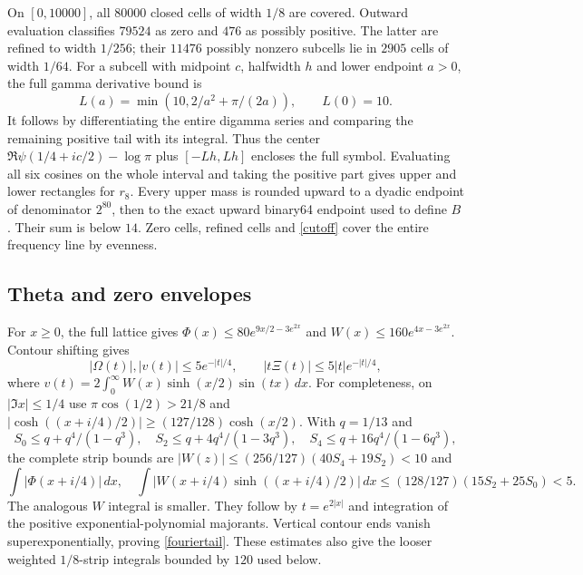 \documentclass[11pt]{article}
\newcommand{\dd}{\,d}
\numberwithin{equation}{section}
\begin{document}
On $[0,10000]$, all $80000$ closed cells of width $1/8$ are covered.
Outward evaluation classifies $79524$ as zero and $476$ as possibly
positive. The latter are refined to width $1/256$; their $11476$
possibly nonzero subcells lie in $2905$ cells of width $1/64$.
For a subcell with midpoint $c$, halfwidth $h$ and lower endpoint
$a>0$, the full gamma derivative bound is
\[
 L(a)=\min(10,2/a^2+\pi/(2a)),\qquad L(0)=10.
\]
It follows by differentiating the entire digamma series and comparing
the remaining positive tail with its integral. Thus the center
$\Re\psi(1/4+ic/2)-\log\pi$ plus $[-Lh,Lh]$ encloses the full
symbol. Evaluating all six cosines on the whole interval and taking
the positive part gives upper and lower rectangles for $r_8$.
Every upper mass is rounded upward to a dyadic endpoint of denominator
$2^{80}$, then to the exact upward binary64 endpoint used to define $B$.
Their sum is below $14$. Zero cells, refined cells and \eqref{cutoff}
cover the entire frequency line by evenness.

\subsection{Theta and zero envelopes}
For $x\ge0$, the full lattice gives
$\Phi(x)\le80e^{9x/2-3e^{2x}}$ and
$W(x)\le160e^{4x-3e^{2x}}$. Contour shifting gives
\begin{equation}\label{fouriertail}
 |\Omega(t)|,|v(t)|\le5e^{-|t|/4},\qquad
 |t\Xi(t)|\le5|t|e^{-|t|/4},
\end{equation}
where $v(t)=2\int_0^\infty W(x)\sinh(x/2)\sin(tx)\dd x$.
For completeness, on $|\Im x|\le1/4$ use
$\pi\cos(1/2)>21/8$ and
$|\cosh((x+i/4)/2)|\ge(127/128)\cosh(x/2)$.
With $q=1/13$ and
\[
 S_0\le q+q^4/(1-q^3),\quad
 S_2\le q+4q^4/(1-3q^3),\quad
 S_4\le q+16q^4/(1-6q^3),
\]
the complete strip bounds are
$|W(z)|\le(256/127)(40S_4+19S_2)<10$ and
\[
 \int|\Phi(x+i/4)|\dd x,\quad
 \int|W(x+i/4)\sinh((x+i/4)/2)|\dd x
       \le(128/127)(15S_2+25S_0)<5.
\]
The analogous $W$ integral is smaller. They follow by
$t=e^{2|x|}$ and integration of the positive exponential-polynomial
majorants. Vertical contour ends vanish superexponentially, proving
\eqref{fouriertail}. These estimates also give the looser weighted
$1/8$-strip integrals bounded by $120$ used below.
\end{document}
